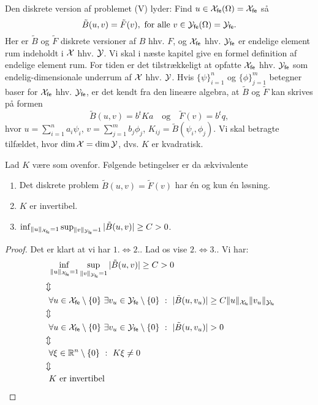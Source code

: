 Den diskrete version af problemet (V) lyder: Find $u\in{\mathcal{X}}_{\mathsf{fe}}(\Omega)={\mathcal{X}}_{\mathsf{fe}}$ så
\begin{equation}
  \tilde{B}(u,v) = \tilde{F}(v), \ \text{for alle $v\in{\mathcal{Y}}_{\mathsf{fe}}(\Omega)={\mathcal{Y}}_{\mathsf{fe}}$.}
\end{equation}
Her er $\tilde{B}$ og $\tilde{F}$ diskrete versioner af $B$ hhv. 
$F$, og ${\mathcal{X}}_{\mathsf{fe}}$ hhv. ${\mathcal{Y}}_{\mathsf{fe}}$ er endelige element rum indeholdt i $\mathcal{X}$
hhv. $\mathcal{Y}$. Vi skal i næste kapitel give en formel definition af
endelige element rum. For tiden er det tilstrækkeligt at opfatte
${\mathcal{X}}_{\mathsf{fe}}$ hhv. ${\mathcal{Y}}_{\mathsf{fe}}$ som endelig-dimensionale underrum af $\mathcal{X}$ hhv.
$\mathcal{Y}$.  Hvis $\{\psi\}_{i=1}^{n}$ og $\{\phi\}_{j=1}^{m}$ betegner baser
for ${\mathcal{X}}_{\mathsf{fe}}$ hhv. ${\mathcal{Y}}_{\mathsf{fe}}$, er det kendt fra den lineære algebra, at 
$\tilde{B}$ og $\tilde{F}$ kan skrives på formen
\begin{equation}
   \tilde{B}(u,v) = b^t Ka \quad \text{og} \quad \tilde{F}(v)=b^t q,
\end{equation}
hvor $u=\sum_{i=1}^{n} a_i \psi_i$, 
$v=\sum_{j=1}^{m} b_j \phi_j$, $K_{ij}=\tilde{B}(\psi_i,\phi_j)$. Vi skal
betragte tilfældet, hvor $\dim \mathcal{X} = \dim \mathcal{Y}$, dvs. $K$ er kvadratisk.
\begin{theorem} \label{eks-ent-dis}
Lad $K$ være som ovenfor. Følgende betingelser er da ækvivalente
\begin{enumerate}
  \item Det diskrete problem $\tilde{B}(u,v) = \tilde{F}(v)$ har
        \'{e}n og kun \'{e}n løsning.
  \item $K$ er invertibel.
  \item $\inf_{\|u\|_{{\mathcal{X}}_{\mathsf{fe}}}=1} \sup_{\|v\|_{{\mathcal{Y}}_{\mathsf{fe}}}=1} |\tilde{B}(u,v)| \geq C >0$.
\end{enumerate}
\end{theorem} 
\begin{proof}
Det er klart at vi har $1. \Leftrightarrow 2.$. Lad os vise $2.
\Leftrightarrow 3.$. Vi har:
\begin{align}
 &\phantom{\Updownarrow} \inf_{\|u\|_{{\mathcal{X}}_{\mathsf{fe}}}=1} \sup_{\|v\|_{{\mathcal{Y}}_{\mathsf{fe}}}=1} 
   |\tilde{B}(u,v)|\geq C >0 \notag \\
 &\Updownarrow \notag \\
 &\phantom{\Updownarrow} \forall u\in {\mathcal{X}}_{\mathsf{fe}}\setminus\{0\} \ \exists
   v_u\in {\mathcal{Y}}_{\mathsf{fe}}\setminus\{0\} \ : \ |\tilde{B}(u,v_u)| \geq C
   \|u\|_{{\mathcal{X}}_{\mathsf{fe}}} \|v_u\|_{{\mathcal{Y}}_{\mathsf{fe}}} \notag \\
 &\Updownarrow \notag \\
 &\phantom{\Updownarrow} \forall u\in {\mathcal{X}}_{\mathsf{fe}}\setminus\{0\} \ \exists
   v_u\in {\mathcal{Y}}_{\mathsf{fe}}\setminus\{0\} \ : \ |\tilde{B}(u,v_u)| > 0 \notag \\
 &\Updownarrow \notag \\ 
 &\phantom{\Updownarrow} \forall \xi \in \mathbb{R}^n\setminus\{0\} 
   \ : \ K\xi \not=0 \notag \\
 &\Updownarrow \notag \\
 &\phantom{\Updownarrow} \text{$K$ er invertibel} \notag
\end{align}
\end{proof}
